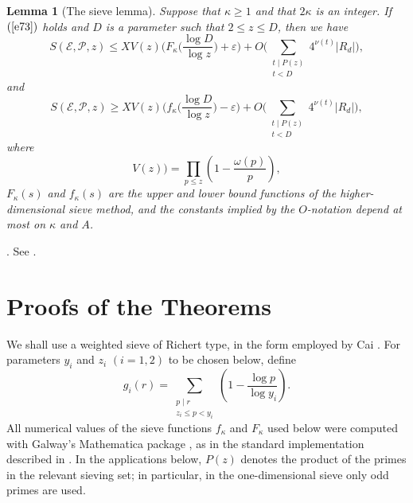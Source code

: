 \documentclass[12pt,a4paper,reqno]{amsart}
\numberwithin{equation}{section}
\theoremstyle{plain}
\newtheorem{lemma}{Lemma}
\theoremstyle{definition}
\begin{document}
\begin{lemma}[The sieve lemma]\label{p1}
Suppose that $\kappa\geq1$ and that $2\kappa$ is an integer.
If $(\ref{e73})$ holds and $D$ is a parameter such that $2\le z \le D$, then we have
\begin{equation*}
S(\mathcal{E}, \mathcal{P}, z)
\le X V(z) \Big(
F_{\kappa}\!\Big( \frac{\log D}{\log z} \Big)+ \varepsilon\Big)
+ O\Big(\sum_{\substack{t \mid P(z) \\ t < D}} 4^{\nu(t)} |R_{d}|\Big)
,
\end{equation*}
and
\begin{equation*}
S(\mathcal{E}, \mathcal{P}, z)
\ge X V(z) \Big(f_{\kappa}\!\Big( \frac{\log D}{\log z} \Big)- \varepsilon\Big)
+O\Big( \sum_{\substack{t \mid P(z) \\ t < D}} 4^{\nu(t)} |R_{d}|\Big)
,
\end{equation*}
where
\begin{equation}\label{e:V}
V(z))=\prod_{ p \leq z}\left(1-\frac{\omega(p)}{p}\right),
\end{equation}
$F_{\kappa}(s)$ and $f_{\kappa}(s)$ are the upper and lower bound functions of the higher-dimensional sieve method,
and the constants implied by the $O$-notation depend at most on $\kappa$ and $A$.
\end{lemma}

. See \cite[Theorem 9.1]{DH}.




\section{Proofs of the Theorems}\label{S:pv_thms}
\setcounter{lemma}{0}
\setcounter{theorem}{0}
\setcounter{corollary}{0}
\setcounter{remark}{0}
\setcounter{equation}{0}
We shall use a weighted sieve of Richert type, in the form employed by Cai \cite{Cai}. For parameters $y_i$ and $z_i$ $(i=1,2)$ to be chosen below, define
\begin{equation}\label{e42}
g_i(r)=
\sum_{\substack{p\mid r\\ z_i\leq p<y_i}}
\left(1-\frac{\log p}{\log y_i}\right).
\end{equation}
All numerical values of the sieve functions $f_\kappa$ and $F_\kappa$ used below were computed with Galway's Mathematica package \cite{Ga}, as in the standard implementation described in \cite{DH}. In the applications below, $P(z)$ denotes the product of the primes in the relevant sieving set; in particular, in the one-dimensional sieve only odd primes are used.
\end{document}
